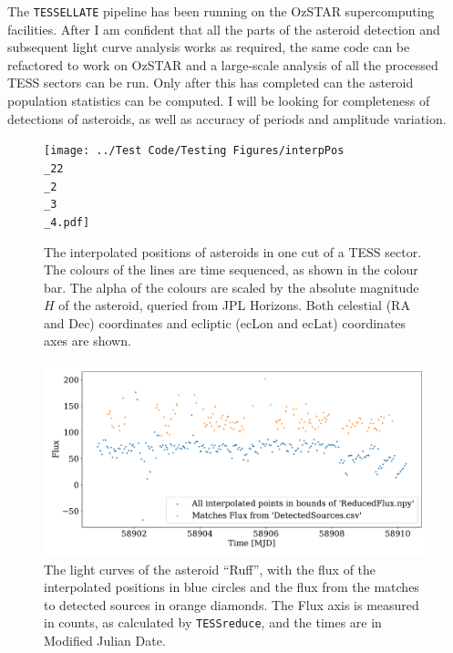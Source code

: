 \documentclass[12pt]{article}
\begin{document}
The \texttt{TESSELLATE} pipeline has been running on the OzSTAR supercomputing facilities. 
After I am confident that all the parts of the asteroid detection and subsequent light curve analysis works as required, the same code can be refactored to work on OzSTAR and a large-scale analysis of all the processed TESS sectors can be run. 
Only after this has completed can the asteroid population statistics can be computed. 
I will be looking for completeness of detections of asteroids, as well as accuracy of periods and amplitude variation.



\begin{figure}
  \centering
    \texttt{[image: ../Test Code/Testing Figures/interpPos\\\_22\\\_2\\\_3\\\_4.pdf]}
    \caption{The interpolated positions of asteroids in one cut of a TESS sector. 
    The colours of the lines are time sequenced, as shown in the colour bar.
    The alpha of the colours are scaled by the absolute magnitude $H$ of the asteroid, queried from JPL Horizons. 
    Both celestial (RA and Dec) coordinates and ecliptic (ecLon and ecLat) coordinates axes are shown.
    }
    \label{Fig:interpPos}
\end{figure}



\begin{figure}
  \centering
  \includegraphics[width =\columnwidth]{../Test Code/Testing Figures/differentFluxes Ruff .pdf}
  \caption{The light curves of the asteroid ``Ruff'', with the flux of the interpolated positions in blue circles and the flux from the matches to detected sources in orange diamonds.
  The Flux axis is measured in counts, as calculated by \texttt{TESSreduce}, and the times are in Modified Julian Date.}
  \label{Fig:DifFlux}
\end{figure}
    
\end{document}
